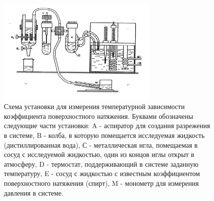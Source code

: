 \documentclass[12pt]{article}
\begin{document}
\begin{figure}
    \centering
    \includegraphics[width=0.7\textwidth]{img1.png}
    \caption{Схема установки для измерения температурной зависимости коэффициента поверхностного натяжения. Буквами обозначены
        следующие части установки: A - аспиратор для создания разрежения в системе, 
        B - колба, в которую помещается исследуемая жидкость (дистиллированная вода),
        С - металлическая игла, помещаемая в сосуд с исследуемой жидкостью, один из концов иглы открыт в атмосферу, 
        D - термостат, поддерживающий в системе заданную температуру, 
        E - сосуд с жидкостью с известным коэффициентом поверхностного натяжения (спирт),
        M - монометр для измерения давления в системе.}
    \label{fig:1}
\end{figure}
\end{document}
